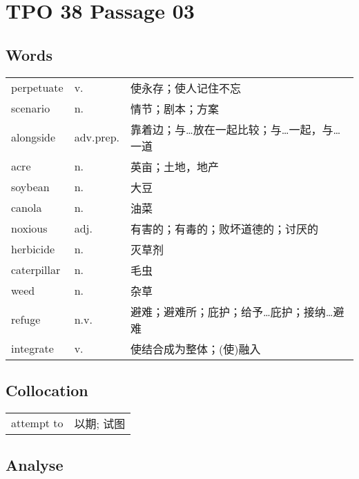 \section{TPO 38 Passage 03}

\subsection{Words}

\begin{tabular}{lll}
    perpetuate & v. & 使永存；使人记住不忘\\
    scenario & n. & 情节；剧本；方案\\
    alongside & adv.prep. & 靠着边；与…放在一起比较；与…一起，与…一道\\
    acre & n. & 英亩；土地，地产\\
    soybean & n. & 大豆\\
    canola & n. & 油菜\\
    noxious & adj. & 有害的；有毒的；败坏道德的；讨厌的\\
    herbicide & n. & 灭草剂\\
    caterpillar & n. & 毛虫\\
    weed & n. & 杂草\\
    refuge & n.v. & 避难；避难所；庇护；给予…庇护；接纳…避难\\
    integrate & v. & 使结合成为整体；(使)融入\\
\end{tabular}

\subsection{Collocation}

\begin{tabular}{ll}
    attempt to & 以期; 试图\\
\end{tabular}

\newpage

\subsection{Analyse}

